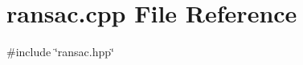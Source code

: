 \section{ransac.\+cpp File Reference}
\label{ransac_8cpp}
{\ttfamily \#include \char`\"{}ransac.\+hpp\char`\"{}}\newline
